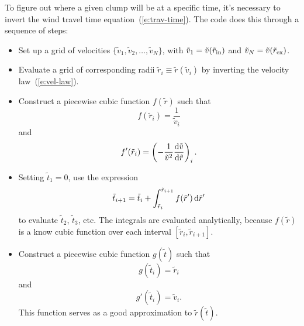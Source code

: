 \documentclass{article}
\newcommand{\tr}{\tilde{r}}
\newcommand{\tv}{\tilde{v}}
\newcommand{\tti}{\tilde{t}}
\newcommand{\trin}{\tilde{r}_{\rm in}}
\newcommand{\trex}{\tilde{r}_{\rm ex}}
\newcommand{\diff}[1]{{\rm d}#1}
\newcommand{\deriv}[2]{\frac{{\rm d}#1}{{\rm d}#2}}
\begin{document}
To figure out where a given clump will be at a specific time, it's
necessary to invert the wind travel time
equation~(\ref{e:trav-time}). The code does this through a sequence of
steps:
%
\begin{itemize}
\item Set up a grid of velocities $\{\tv_{1}, \tv_{2}, \ldots,
  \tv_{N}\}$, with $\tv_{1} = \tv(\trin)$ and $\tv_{N} = \tv(\trex)$.
\item Evaluate a grid of corresponding radii $\tr_{i} \equiv \tr(\tv_{i})$ by
  inverting the velocity law~(\ref{e:vel-law}).
\item Construct a piecewise cubic function $f(\tr)$ such that
  \[
  f(\tr_{i}) = \frac{1}{\tv_{i}}
  \]
  and
  \[
  f'(\tr_{i}) = \left( -\frac{1}{\tv^{2}} \deriv{\tv}{\tr} \right)_{i}.
  \]
\item Setting $\tti_{1} = 0$, use the expression
  \[
  \tti_{i+1} = \tti_{i} + \int_{\tr_{i}}^{\tr_{i+1}} f(\tr') \,\diff{\tr'}
  \]
  to evaluate $\tti_{2}$, $\tti_{3}$, etc. The integrals are evaluated
  analytically, because $f(\tr)$ is a know cubic function over each
  interval $[\tr_{i},\tr_{i+1}]$.
\item Construct a piecewise cubic function $g(\tti)$ such that
  \[
  g(\tti_{i}) = \tr_{i}
  \]
  and
  \[
  g'(\tti_{i}) = \tv_{i}.
  \]
  This function serves as a good approximation to $\tr(\tti)$.
\end{itemize}
%
\end{document}
